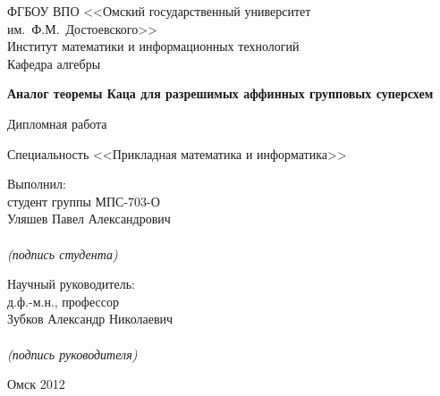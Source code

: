 \begin{titlepage}
  \begin{center}
    \begin{bf}
      ФГБОУ ВПО <<Омский государственный университет им.~Ф.М.~Достоевского>>\\
        \vspace{2mm}
      Институт математики и информационных технологий \\
        \vspace{2mm}
      Кафедра алгебры
    \end{bf}

    \vfill\vfill

    \begin{LARGE}
      \textbf{Аналог теоремы Каца для разрешимых аффинных групповых суперсхем} \\
    \end{LARGE}

    \begin{Large}
      Дипломная работа \\
    \end{Large}
    Специальность <<Прикладная математика и информатика>>
  \end{center}

  \vfill

  \hfill \parbox{7cm}{
        Выполнил: \\
        студент группы МПС-703-О \\
        Уляшев Павел Александрович \\
        \underline{{}\hspace{5cm}{}} \\
        \vspace{-0.7mm}
        \textit{(подпись студента)}

        \vspace{8mm}

        Научный руководитель: \\
        д.ф.-м.н., профессор \\
        Зубков Александр Николаевич \\
        \underline{{}\hspace{5cm}{}} \\
        \vspace{-0.7mm}
        \textit{(подпись руководителя)}
    }

  \vfill

  \begin{center}
    \large Омск 2012
  \end{center}

\end{titlepage}
